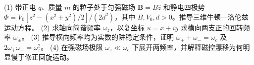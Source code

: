 (1) 带正电 \(q\)、质量 \(m\) 的粒子处于匀强磁场 \(\mathbf B=B\hat z\) 和静电四极势 \(\Phi=V_0[z^2-(x^2+y^2)/2]/(2d^2)\)，其中 \(B,V_0,d>0\)。推导三维牛顿—洛伦兹运动方程。
(2) 求轴向简谐频率 \(\omega_z\)，以复坐标 \(u=x+iy\) 求横向两支正的回转频率 \(\omega_\pm\)。
(3) 推导横向频率均为实数的阱稳定条件，证明 \(\omega_++\omega_-=\omega_c\) 及 \(2\omega_+\omega_-=\omega_z^2\)。
(4) 在强磁场极限 \(\omega_z\ll\omega_c\) 下展开两频率，并解释磁控漂移为何明显慢于修正回旋运动。
